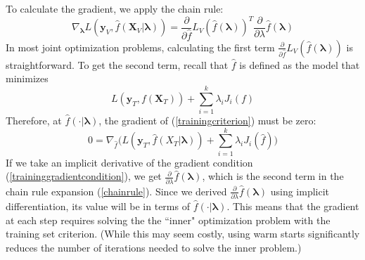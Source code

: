 \documentclass[10pt,letterpaper]{article}
\begin{document}
\begin{center}
\end{center}
To calculate the gradient, we apply the chain rule:
\begin{equation}
\nabla_{\boldsymbol{\lambda}} L(\boldsymbol{y}_V, \hat f(\boldsymbol{X}_V | \boldsymbol{\lambda})) = \frac{\partial}{\partial \hat f}L_V(\hat f(\boldsymbol{\lambda}))^T \frac{\partial}{\partial \lambda} \hat f(\boldsymbol{\lambda})
\label{chainrule}
\end{equation}
In most joint optimization problems, calculating the first term $\frac{\partial}{\partial \hat f}L_V(\hat f(\boldsymbol{\lambda}))$ is straightforward. To get the second term, recall that $\hat f$ is defined as the model that minimizes
\begin{equation}
L(\boldsymbol{y}_T, f (\boldsymbol{X}_T)) + \sum\limits_{i=1}^k \lambda_i J_i(f)
\label{trainingcriterion}
\end{equation}
Therefore, at $\hat f(\cdot | \boldsymbol{\lambda})$, the gradient of (\ref{trainingcriterion}) must be zero:
\begin{equation}
0 = \nabla_{\hat f} \bigg(L(\boldsymbol y_T, \hat f (X_T | \boldsymbol{\lambda})) + \sum\limits_{i=1}^k \lambda_i J_i(\hat f) \bigg)
\label{traininggradientcondition}
\end{equation}
If we take an implicit derivative of the gradient condition (\ref{traininggradientcondition}), we get $\frac{\partial}{\partial \lambda} \hat f(\boldsymbol{\lambda})$, which is the second term in the chain rule expansion (\ref{chainrule}). Since we derived $\frac{\partial}{\partial \lambda} \hat f(\boldsymbol{\lambda})$ using implicit differentiation, its value will be in terms of $\hat f(\cdot | \boldsymbol{\lambda})$. This means that the gradient at each step requires solving the the ``inner" optimization problem with the training set criterion. (While this may seem costly, using warm starts significantly reduces the number of iterations needed to solve the inner problem.)
\end{document}
